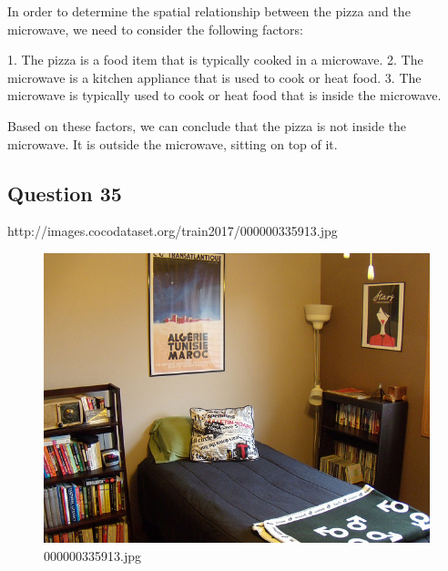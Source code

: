 \begin{enumerate}
        In order to determine the spatial relationship between the pizza and the microwave, we need to consider the following factors:
        
        1. The pizza is a food item that is typically cooked in a microwave.
        2. The microwave is a kitchen appliance that is used to cook or heat food.
        3. The microwave is typically used to cook or heat food that is inside the microwave.
        
        Based on these factors, we can conclude that the pizza is not inside the microwave. It is outside the microwave, sitting on top of it.
    \end{enumerate}
    \subsection*{Question 35}
    http://images.cocodataset.org/train2017/000000335913.jpg
    \begin{figure}[h]
        \centering
        \includegraphics[width=0.8\linewidth]{../image set/easy/000000335913.jpg}
        \caption{000000335913.jpg}
    \end{figure}
